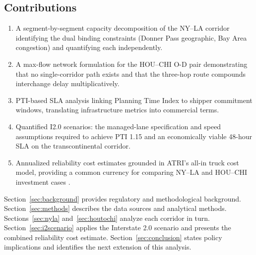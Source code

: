 \subsection{Contributions}

\begin{enumerate}
  \item A segment-by-segment capacity decomposition of the NY--LA corridor identifying the dual binding constraints (Donner Pass geographic, Bay Area congestion) and quantifying each independently.
  \item A max-flow network formulation for the HOU--CHI O-D pair demonstrating that no single-corridor path exists and that the three-hop route compounds interchange delay multiplicatively.
  \item PTI-based SLA analysis linking Planning Time Index to shipper commitment windows, translating infrastructure metrics into commercial terms.
  \item Quantified I2.0 scenarios: the managed-lane specification and speed assumptions required to achieve PTI 1.15 and an economically viable 48-hour SLA on the transcontinental corridor.
  \item Annualized reliability cost estimates grounded in ATRI's all-in truck cost model, providing a common currency for comparing NY--LA and HOU--CHI investment cases \citep{ROUTE_A1,ROUTE_A2}.
\end{enumerate}

Section~\ref{sec:background} provides regulatory and methodological background. Section~\ref{sec:methods} describes the data sources and analytical methods. Sections~\ref{sec:nyla} and~\ref{sec:houtochi} analyze each corridor in turn. Section~\ref{sec:i2scenario} applies the Interstate 2.0 scenario and presents the combined reliability cost estimate. Section~\ref{sec:conclusion} states policy implications and identifies the next extension of this analysis.
